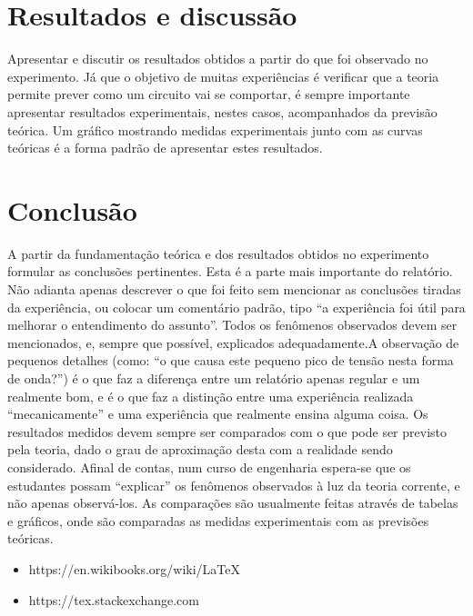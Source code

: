 \documentclass[10pt,conference]{IEEEtran}                      %
\begin{document}
\section{Resultados e discussão}
Apresentar e discutir os resultados obtidos a partir do que foi observado no experimento. Já que o objetivo de muitas experiências é verificar que a teoria permite prever como um circuito vai se comportar, é sempre importante apresentar resultados experimentais, nestes casos, acompanhados da previsão teórica. Um gráfico mostrando medidas experimentais junto com as curvas teóricas é a forma padrão de apresentar estes resultados.~\cite{lamport94}
\section{Conclusão}
A partir da fundamentação teórica e dos resultados obtidos no experimento formular as conclusões pertinentes. Esta é a parte mais importante do relatório. Não adianta apenas descrever o que foi feito sem mencionar as conclusões tiradas da experiência, ou colocar um comentário padrão, tipo “a experiência foi útil para melhorar o entendimento do assunto”. Todos os fenômenos observados devem ser mencionados, e, sempre que possível, explicados adequadamente.A observação de pequenos detalhes (como: “o que causa este pequeno pico de tensão nesta forma de onda?”) é o que faz a diferença entre um relatório apenas regular e um realmente bom, e é o que faz a distinção entre uma experiência realizada “mecanicamente” e uma experiência que realmente ensina alguma coisa. Os resultados medidos devem sempre ser comparados com o que pode ser previsto pela teoria, dado o grau de aproximação desta com a realidade sendo considerado. Afinal de contas, num curso de engenharia espera-se que os estudantes possam “explicar” os fenômenos observados à luz da teoria corrente, e não apenas observá-los. As comparações são usualmente feitas através de tabelas e gráficos, onde são comparadas as medidas experimentais com as previsões teóricas\cite{itseez2015opencv}.
\begin{itemize}
	\item https://en.wikibooks.org/wiki/LaTeX
	\item https://tex.stackexchange.com
\end{itemize}

%
%
\printbibliography[heading=none]{}


\end{document}
